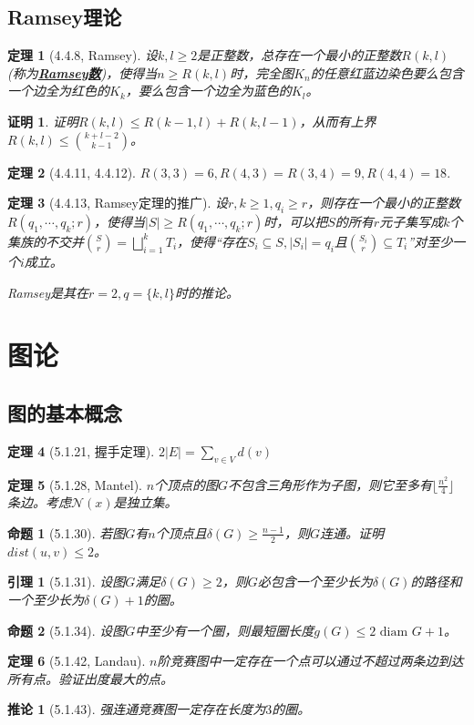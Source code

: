 \documentclass[landscape, a4paper]{article}
\theoremstyle{compact}
\newtheorem{theorem}{定理}
\newtheorem{lemma}{引理}
\newtheorem{corollary}{推论}
\newtheorem{proposition}{命题}
\newtheorem{Proof}{证明}
\def\obj#1{\textbf{\uline{#1}}}
\def\le{\leqslant}
\def\ge{\geqslant}
\begin{document}
\begin{multicols}{3}
\subsection{Ramsey理论}
\begin{theorem}[4.4.8, Ramsey]
	设$k, l \ge 2$是正整数，总\textit{存在}一个最小的正整数$R(k, l)$(称为\obj{Ramsey数})，使得当$n \ge R(k, l)$时，完全图$K_n$的任意红蓝边染色要么包含一个边全为红色的$K_k$，要么包含一个边全为蓝色的$K_l$。
\end{theorem}
\begin{Proof}
	证明$R(k, l) \le R(k-1, l) + R(k, l - 1)$，从而有上界$R(k, l) \le \binom{k + l - 2}{k - 1}$。
\end{Proof}
\begin{theorem}[4.4.11, 4.4.12]
	$R(3, 3) = 6, R(4, 3) = R(3, 4) = 9, R(4, 4) = 18.$
\end{theorem}
\begin{theorem}[4.4.13, Ramsey定理的推广]
	设$r, k \ge 1, q_i \ge r$，则\textit{存在}一个最小的正整数$R(q_1, \cdots, q_k; r)$，使得当$|S| \ge R(q_1, \cdots, q_k; r)$时，可以把$S$的所有$r$元子集写成$k$个集族的不交并$\binom{S}{r} = \bigsqcup_{i=1}^{k}T_i$，使得“存在$S_i \subseteq S, |S_i| = q_i$且$\binom{S_i}{r} \subseteq T_i$”对至少一个$i$成立。
	
	\textit{Ramsey是其在$r=2, q = \{k, l\}$时的推论。}
\end{theorem}
\section{图论}
\subsection{图的基本概念}
\begin{theorem}[5.1.21, 握手定理]
	$2|E| = \sum_{v \in V}d(v)$
\end{theorem}
\begin{theorem}[5.1.28, Mantel]
	$n$个顶点的图$G$不包含三角形作为子图，则它至多有$\lfloor \frac{n^2}{4} \rfloor$条边。\textit{考虑$\mathcal N(x)$是独立集。}
\end{theorem}
\begin{proposition}[5.1.30]
	若图$G$有$n$个顶点且$\delta(G) \ge \frac{n-1}{2}$，则$G$连通。\textit{证明$dist(u, v) \le 2$。}
\end{proposition}
\begin{lemma}[5.1.31]
	设图$G$满足$\delta(G) \ge 2$，则$G$必包含一个至少长为$\delta(G)$的路径和一个至少长为$\delta(G)+1$的圈。
\end{lemma}
\begin{proposition}[5.1.34]
	设图$G$中至少有一个圈，则最短圈长度$g(G) \le 2\text{ diam } G + 1$。
\end{proposition}
\begin{theorem}[5.1.42, Landau]
	$n$阶竞赛图中一定存在一个点可以通过不超过两条边到达所有点。\textit{验证出度最大的点。}
\end{theorem}
\begin{corollary}[5.1.43]
	强连通竞赛图一定存在长度为$3$的圈。
\end{corollary}

\end{multicols}
\end{document}
